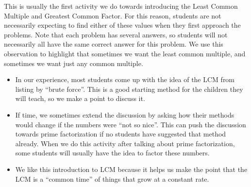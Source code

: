 \documentclass[nooutcomes]{ximera}
\begin{document}
\newpage
\begin{instructorNotes}
This is usually the first activity we do towards introducing the Least Common Multiple and Greatest Common Factor.  For this reason, students are not necessarily expecting to find either of these values when they first approach the problems.  Note that each problem has several answers, so students will not necessarily all have the same correct answer for this problem. We use this observation to highlight that sometimes we want the least common multiple, and sometimes we want just any common multiple.

\begin{itemize}
	\item In our experience, most students come up with the idea of the LCM from listing by ``brute force''. This is a good starting method for the children they will teach, so we make a point to discuss it.
	\item If time, we sometimes extend the discussion by asking how their methods would change if the numbers were ``not so nice''.  This can push the discussion towards prime factorization if no students have suggested that method already.  When we do this activity after talking about prime factorization, some students will usually have the idea to factor these numbers.
	\item We like this introduction to LCM because it helps us make the point that the LCM is a ``common time'' of things that grow at a constant rate. %
\end{itemize}

\end{instructorNotes}
\end{document}
